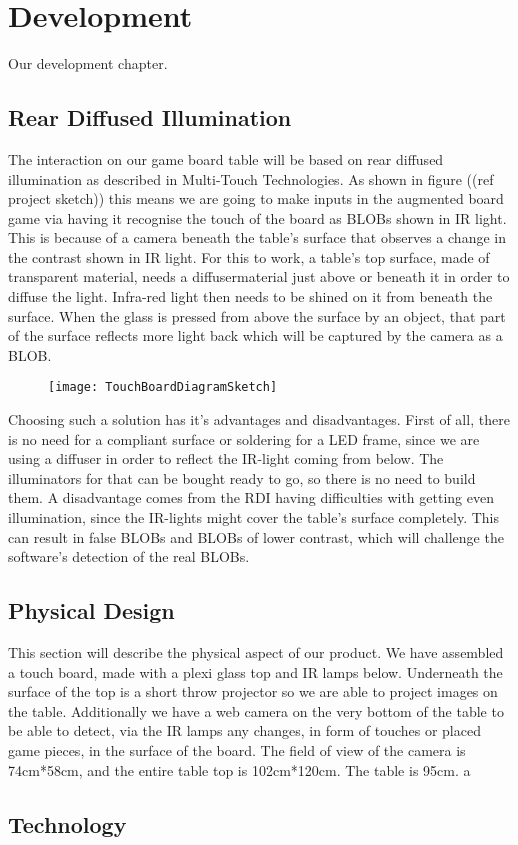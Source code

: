 \chapter{Development}\label{ch:development}
Our development chapter. 

\section{Rear Diffused Illumination}
The interaction on our game board table will be based on rear diffused illumination as described in Multi-Touch Technologies\citep{multiTT}. As shown in figure ((ref project sketch)) this means we are going to make inputs in the augmented board game via having it recognise the touch of the board as BLOBs shown in IR light. This is because of a camera beneath the table's surface that observes a change in the contrast shown in IR light. 
For this to work, a table's top surface, made of transparent material, needs a diffusermaterial just above or beneath it in order to diffuse the light. Infra-red light then needs to be shined on it from beneath the surface. When the glass is pressed from above the surface by an object, that part of the surface reflects more light back which will be captured by the camera as a BLOB.

\begin{figure}[!h]
\centering	\texttt{[image: TouchBoardDiagramSketch]}
\end{figure}

Choosing such a solution has it's advantages and disadvantages. First of all, there is no need for a compliant surface or soldering for a LED frame, since we are using a diffuser in order to reflect the IR-light coming from below. The illuminators for that can be bought ready to go, so there is no need to build them. A disadvantage comes from the RDI having difficulties with getting even illumination, since the IR-lights might cover the table's surface completely. This can result in false BLOBs and BLOBs of lower contrast, which will challenge the software's detection of the real BLOBs.

\section{Physical Design} 
This section will describe the physical aspect of our product.
We have assembled a touch board, made with a plexi glass top and IR lamps below. Underneath the surface of the top is a short throw projector so we are able to project images on the table. Additionally we have a web camera on the very bottom of the table to be able to detect, via the IR lamps any changes, in form of touches or placed game pieces, in the surface of the board. 
The field of view of the camera is 74cm*58cm, and the entire table top is 102cm*120cm. The table is 95cm. 
a

\section{Technology}

